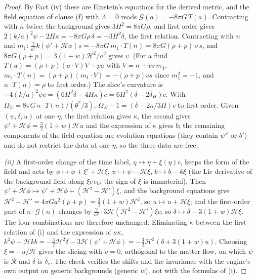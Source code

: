 \begin{proof}
By Fact (iv) these are Einstein's equations for the derived metric, and the field equation of clause (f) with $\Lambda = 0$ reads $\mathcal{G}(a) = -8\pi G\,T(a)$. Contracting with $n$ twice: the background gives $3H^{2} = 8\pi G\rho$, and first order gives $2(k/a)^{2}\psi - 2H\kappa = -8\pi G\rho\,\delta = -3H^{2}\delta$, the first relation. Contracting with $n$ and $m_{1}$: $\tfrac{2}{a^{2}}k(\psi' + \mathcal{H}\phi)s = -8\pi G\,m_{1}\cdot T(n) = 8\pi G(\rho + p)\,v\,s$, and $8\pi G(\rho + p) = 3(1 + w)\mathcal{H}^{2}/a^{2}$ gives $v$. (For a fluid $T(a) = (\rho + p)(a\cdot V)V - pa$ with $V = n + vs\,m_{1}$, $m_{1}\cdot T(n) = (\rho + p)(m_{1}\cdot V) = -(\rho + p)vs$ since $m_{1}^{2} = -1$, and $n\cdot T(n) = \rho$ to first order.) The slice's curvature is $-4(k/a)^{2}\psi c = (6H^{2}\delta - 4H\kappa)c = 6H^{2}(\delta - 2\delta_{H})c$. With $\Omega_{\Sigma} = 8\pi G\,n\cdot T(n)/(\theta^{2}/3)$, $\Omega_{\Sigma} - 1 = (\delta - 2\kappa/3H)c$ to first order. Given $(\psi, \delta, u)$ at one $\eta$, the first relation gives $\kappa$, the second gives $\psi' + \mathcal{H}\phi = \tfrac32(1 + w)\mathcal{H}u$ and the expression of $\kappa$ gives $b$; the remaining components of the field equation are evolution equations (they contain $\psi''$ or $b'$) and do not restrict the data at one $\eta$, so the three data are free.

\emph{(ii)} A first-order change of the time label, $\eta \mapsto \eta + \xi(\eta)c$, keeps the form of the field and acts by $\phi \mapsto \phi + \xi' + \mathcal{H}\xi$, $\psi \mapsto \psi - \mathcal{H}\xi$, $b \mapsto b - k\xi$ (the Lie derivative of the background field along $\xi c\,e_{0}$; the sign of $\xi$ is immaterial). Then $\psi' + \mathcal{H}\phi \mapsto \psi' + \mathcal{H}\phi + (\mathcal{H}^{2} - \mathcal{H}')\xi$, and the background equations give $\mathcal{H}^{2} - \mathcal{H}' = 4\pi Ga^{2}(\rho + p) = \tfrac32(1 + w)\mathcal{H}^{2}$, so $u \mapsto u + \mathcal{H}\xi$; and the first-order part of $n\cdot\mathcal{G}(n)$ changes by $\tfrac{2}{a^{2}}\cdot 3\mathcal{H}(\mathcal{H}^{2} - \mathcal{H}')\xi c$, so $\delta \mapsto \delta - 3(1 + w)\mathcal{H}\xi$. The four combinations are therefore unchanged. Eliminating $\kappa$ between the first relation of (i) and the expression of $a\kappa$, $k^{2}\psi - \mathcal{H}kb = -\tfrac32\mathcal{H}^{2}\delta - 3\mathcal{H}(\psi' + \mathcal{H}\phi) = -\tfrac32\mathcal{H}^{2}(\delta + 3(1 + w)u)$. Choosing $\xi = -u/\mathcal{H}$ gives the slicing with $v = 0$, orthogonal to the matter flow, on which $\psi$ is $\mathcal{R}$ and $\delta$ is $\delta_{c}$. The check verifies the shifts and the invariance with the engine's own output on generic backgrounds (generic $w$), not with the formulas of (i).


\end{proof}

